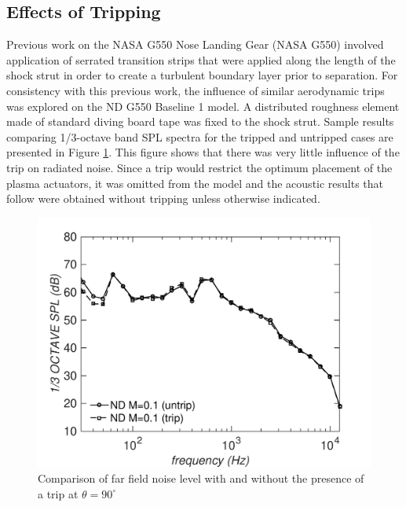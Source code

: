 \subsection{Effects of Tripping}
Previous work on the NASA G550 Nose Landing Gear (NASA G550) involved application of serrated transition strips that were applied along the length of the shock strut in order to create a turbulent boundary layer prior to separation. For consistency with this previous work, the influence of similar aerodynamic trips was explored on the ND G550 Baseline 1 model. A distributed roughness element made of standard diving board tape was fixed to the shock strut. Sample results comparing 1/3-octave band SPL spectra for the tripped and untripped cases are presented in Figure \ref{fig:trip}. This figure shows that there was very little influence of the trip on radiated noise. Since a trip would restrict the optimum placement of the plasma actuators, it was omitted from the model and the acoustic results that follow were obtained without tripping unless otherwise indicated.

\begin{figure}
	\begin{center}
		\centerline{\includegraphics[scale=0.7]{figures/mic_trip}}
		\caption{Comparison of far field noise level with and without the presence of a trip at $\theta = 90^\circ$}
		\label{fig:trip}
	\end{center}
\end{figure}

